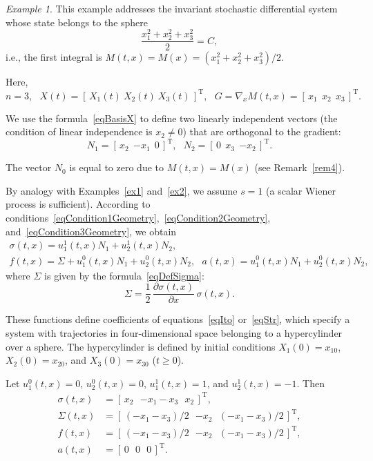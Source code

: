 \documentclass[10pt,reqno]{amsart}
\newcommand{\trans}{{\scriptscriptstyle \mathrm{T}}}
\theoremstyle{plain}
\theoremstyle{remark}
\newtheorem{Example}{Example}
\begin{document}
\begin{Example}\label{ex3}
This example addresses the invariant stochastic differential system whose state belongs to the sphere
\[
  \frac{x_1^2 + x_2^2 + x_3^2}{2} = C,
\]
i.e., the first integral is $M(t,x) = M(x) = (x_1^2 + x_2^2 + x_3^2)/2$.

Here,
\[
  n = 3, \ \ \ X(t) = [ \, X_1(t) ~ X_2(t) ~ X_3(t) \, ]^\trans, \ \ \ G = \nabla_x M(t,x) = [ \, x_1 \ \ x_2 \ \ x_3 \, ]^\trans.
\]

We use the formula~\eqref{eqBasisX} to define two linearly independent vectors (the condition of linear independence is $x_2 \neq 0$) that are orthogonal to the gradient:
\[
  N_1 = [ \, x_2 \ \ {-x_1} \ \ 0 \, ]^\trans, \ \ \ N_2 = [ \, 0 \ \ x_3 \ \ {-x_2} \, ]^\trans.
\]

The vector $N_0$ is equal to zero due to $M(t,x) = M(x)$ (see Remark~\ref{rem4}).

By analogy with Examples~\ref{ex1} and~\ref{ex2}, we assume $s = 1$ (a scalar Wiener process is sufficient). According to conditions~\eqref{eqCondition1Geometry},~\eqref{eqCondition2Geometry}, and~\eqref{eqCondition3Geometry}, we obtain
\begin{gather*}
  \sigma(t,x) = u_1^1(t,x) N_1 + u_2^1(t,x) N_2, \\
  f(t,x) = \Sigma + u_1^0(t,x) N_1 + u_2^0(t,x) N_2, \ \ \ a(t,x) = u_1^0(t,x) N_1 + u_2^0(t,x) N_2,
\end{gather*}
where $\Sigma$ is given by the formula~\eqref{eqDefSigma}:
\[
  \Sigma = \frac{1}{2} \, \frac{\partial \sigma(t,x)}{\partial x} \, \sigma(t,x).
\]

These functions define coefficients of equations~\eqref{eqIto} or~\eqref{eqStr}, which specify a system with trajectories in four-dimensional space belonging to a hypercylinder over a sphere. The hypercylinder is defined by initial conditions $X_1(0) = x_{10}$, $X_2(0) = x_{20}$, and $X_3(0) = x_{30}$ ($t \geqslant 0$).

Let $u_1^0(t,x) = 0$, $u_2^0(t,x) = 0$, $u_1^1(t,x) = 1$, and $u_2^1(t,x) = -1$. Then
\begin{align*}
  \sigma(t,x) & = [ \, x_2 \ \ \ {-x_1 - x_3} \ \ \ x_2 \, ]^\trans, \\
  \Sigma(t,x) & = [ \, (-x_1 - x_3)/2 \ \ \ {-x_2} \ \ \ (-x_1 - x_3)/2 \, ]^\trans, \\
  f(t,x) & = [ \, (-x_1 - x_3)/2 \ \ \ {-x_2} \ \ \ (-x_1 - x_3)/2 \, ]^\trans, \\
  a(t,x) & = [ \, 0 \ \ \ 0 \ \ \ 0 \, ]^\trans.
\end{align*}


\end{Example}
\end{document}
